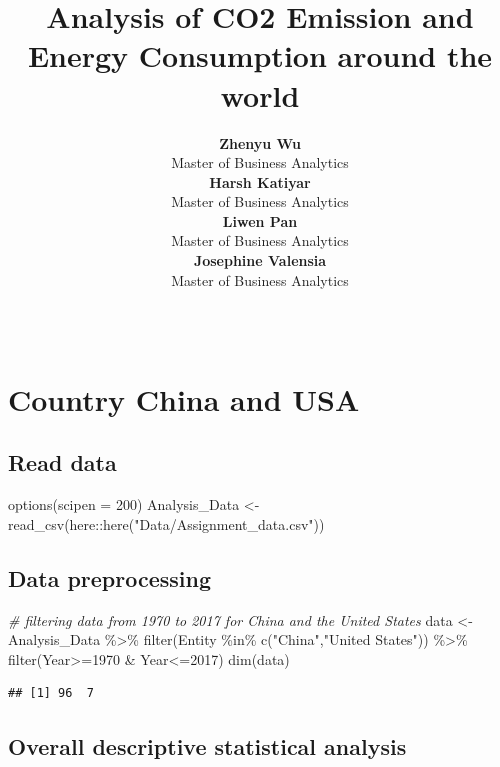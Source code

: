 \documentclass[11pt,a4paper,]{article}
\title{Analysis of CO2 Emission and Energy Consumption around the world}
\author{\sf\Large\textbf{ Zhenyu Wu}\\ {\sf\large Master of Business Analytics\\[0.5cm]} \sf\Large\textbf{ Harsh Katiyar}\\ {\sf\large Master of Business Analytics\\[0.5cm]} \sf\Large\textbf{ Liwen Pan}\\ {\sf\large Master of Business Analytics\\[0.5cm]} \sf\Large\textbf{ Josephine Valensia}\\ {\sf\large Master of Business Analytics\\[0.5cm]}}
\date{\sf\Date~\Month~\Year}
\makeatletter
\newenvironment{Shaded}{\begin{snugshade}}{\end{snugshade}}
\newcommand{\AttributeTok}[1]{\textcolor[rgb]{0.77,0.63,0.00}{#1}}
\newcommand{\CommentTok}[1]{\textcolor[rgb]{0.56,0.35,0.01}{\textit{#1}}}
\newcommand{\DecValTok}[1]{\textcolor[rgb]{0.00,0.00,0.81}{#1}}
\newcommand{\FunctionTok}[1]{\textcolor[rgb]{0.00,0.00,0.00}{#1}}
\newcommand{\NormalTok}[1]{#1}
\newcommand{\OtherTok}[1]{\textcolor[rgb]{0.56,0.35,0.01}{#1}}
\newcommand{\SpecialCharTok}[1]{\textcolor[rgb]{0.00,0.00,0.00}{#1}}
\newcommand{\StringTok}[1]{\textcolor[rgb]{0.31,0.60,0.02}{#1}}
\def\titlepage{\front{\expandafter{\@title}}{\@author}{\@organization}}
\makeatother
\begin{document}
\titlepage

\section*{Country China and USA}

\hypertarget{read-data}{%
\subsection{Read data}\label{read-data}}

\begin{Shaded}
\begin{Highlighting}[]
\FunctionTok{options}\NormalTok{(}\AttributeTok{scipen =} \DecValTok{200}\NormalTok{)}
\NormalTok{Analysis\_Data }\OtherTok{\textless{}{-}} \FunctionTok{read\_csv}\NormalTok{(here}\SpecialCharTok{::}\FunctionTok{here}\NormalTok{(}\StringTok{"Data/Assignment\_data.csv"}\NormalTok{))}
\end{Highlighting}
\end{Shaded}

\hypertarget{data-preprocessing}{%
\subsection{Data preprocessing}\label{data-preprocessing}}

\begin{Shaded}
\begin{Highlighting}[]
\CommentTok{\# filtering data from 1970 to 2017 for China and the United States}
\NormalTok{data }\OtherTok{\textless{}{-}}\NormalTok{ Analysis\_Data }\SpecialCharTok{\%\textgreater{}\%}
  \FunctionTok{filter}\NormalTok{(Entity }\SpecialCharTok{\%in\%} \FunctionTok{c}\NormalTok{(}\StringTok{"China"}\NormalTok{,}\StringTok{"United States"}\NormalTok{)) }\SpecialCharTok{\%\textgreater{}\%}
  \FunctionTok{filter}\NormalTok{(Year}\SpecialCharTok{\textgreater{}=}\DecValTok{1970} \SpecialCharTok{\&}\NormalTok{ Year}\SpecialCharTok{\textless{}=}\DecValTok{2017}\NormalTok{)}
\FunctionTok{dim}\NormalTok{(data)}
\end{Highlighting}
\end{Shaded}

\begin{verbatim}
## [1] 96  7
\end{verbatim}

\hypertarget{overall-descriptive-statistical-analysis}{%
\subsection{Overall descriptive statistical analysis}\label{overall-descriptive-statistical-analysis}}
\end{document}
